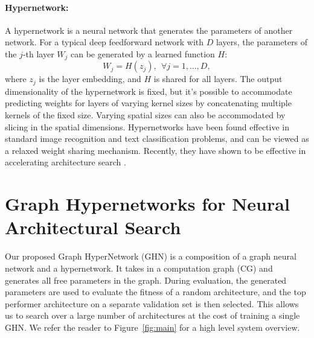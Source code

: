 \paragraph{Hypernetwork:}
A hypernetwork \citep{ha2016hypernetworks} is a neural network that generates the parameters of
another network. For a typical deep feedforward network with $D$ layers, the parameters of the
$j$-th layer $W_j$ can be generated by a learned function $H$:
\begin{equation}
W_j = H(z_j), \ \ \forall j = 1, \dots, D,
\end{equation}
where $z_j$ is the layer embedding, and $H$ is shared for all layers. 
The output dimensionality of the hypernetwork is fixed, but it's possible to accommodate predicting weights for layers of varying kernel sizes by concatenating multiple kernels of the fixed size. Varying spatial sizes can also be accommodated by slicing in the spatial dimensions. Hypernetworks have been found effective in standard image recognition and text classification problems, and can be viewed as a relaxed weight sharing mechanism. Recently, they have shown to be effective in accelerating architecture search \citep{brock2017smash}.

\section{Graph Hypernetworks for Neural Architectural Search}
Our proposed Graph HyperNetwork (GHN) is a composition of a graph neural network and a hypernetwork.
It takes in a computation graph (CG) and generates all free parameters in the graph. During
evaluation, the generated parameters are used to evaluate the fitness of a random architecture, and
the top performer architecture on a separate validation set is then selected. This allows us to
search over a large number of architectures at the cost of training a single GHN. We refer the
reader to Figure~\ref{fig:main} for a high level system overview.

